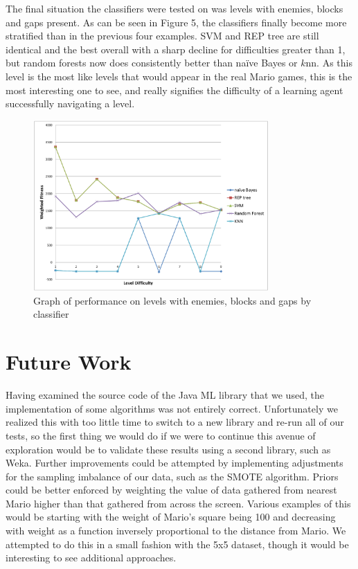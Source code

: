 \documentclass[]{article}   %
\begin{document}
The final situation the classifiers were tested on was levels with enemies, blocks and gaps present. As can be seen in Figure 5, the classifiers finally become 
more stratified than in the previous four examples. SVM and REP tree are still identical and the best overall with a sharp decline for difficulties greater than 1, but 
random forests now does consistently better than na\"{i}ve Bayes or $k$nn. As this level is the most like levels that would appear in the real Mario games, this is the most
interesting one to see, and really signifies the difficulty of a learning agent successfully navigating a level.
\begin{figure}[H]
\centering
\includegraphics[width=90mm]{enemiesblocksgaps.png}
\caption{Graph of performance on levels with enemies, blocks and gaps by classifier}
\end{figure}

\section{Future Work}

Having examined the source code of the Java ML library that we used, the implementation of some algorithms was not entirely correct. Unfortunately we realized this with too
little time to switch to a new library and re-run all of our tests, so the first thing we would do if we were to continue this avenue of exploration would be to validate
these results using a second library, such as Weka.
\newline\newline
Further improvements could be attempted by implementing adjustments for the sampling imbalance of our data, such as the SMOTE algorithm.
\newline\newline
Priors could be better enforced by weighting the value of data gathered from nearest Mario higher than that gathered from across the screen. Various examples of this would be
starting with the weight of Mario's square being 100 and decreasing with weight as a function inversely proportional to the distance from Mario. We attempted to do this in a
small fashion with the 5x5 dataset, though it would be interesting to see additional approaches.
\end{document}
